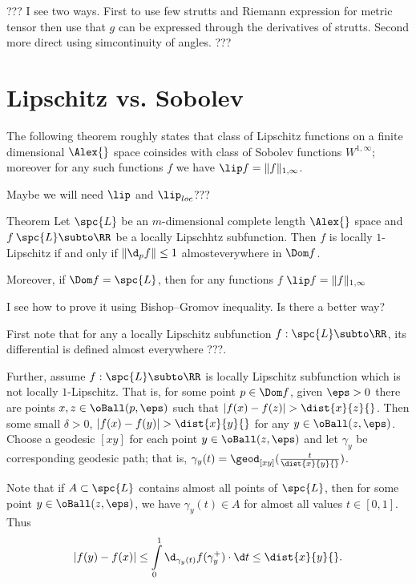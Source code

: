 ??? I see two ways. First to use few strutts and Riemann expression for metric tensor then use that $g$ can be expressed through the derivatives of strutts.
Second more direct using  simcontinuity of angles.
???
\qeds












\section{Lipschitz vs. Sobolev}

The following theorem roughly states that class of Lipschitz functions on a finite dimensional $\Alex{}$ space 
coinsides with class of Sobolev functions $W^{1,\infty}$;
moreover for any such functions $f$ we have $\lip f=\|f\|_{1,\infty}$. 

Maybe we will need $\lip$ and $\lip_{loc}$???

\begin{thm}{Theorem}
Let $\spc{L}$ be an $m$-dimensional complete length $\Alex{}$ space and $f\:\spc{L}\subto\RR$ be a locally Lipschhtz subfunction.
Then $f$ is locally $1$-Lipschitz if and only if $\|\d_pf\|\le1$ almosteverywhere in $\Dom f$.

Moreover, if $\Dom f=\spc{L}$, then for any functions $f$
$\lip f=\|f\|_{1,\infty}$
\end{thm}

 I see how to prove it using Bishop--Gromov inequality.
Is there a better way?

First note that for any a locally Lipschitz subfunction $f:\spc{L}\subto\RR$,
its differential is defined almost everywhere ???.

Further, assume $f:\spc{L}\subto\RR$ is locally Lipschitz subfunction which is not locally $1$-Lipschitz.
That is, for some point $p\in \Dom f$, given $\eps>0$ there are points $x,z\in\oBall(p,\eps)$ such that $|f(x)-f(z)|>\dist{x}{z}{}$.
Then some small $\delta>0$,
$|f(x)-f(y)|>\dist{x}{y}{}$
for any $y\in\oBall(z,\eps)$.
Choose a geodesic $[xy]$ for each point $y\in\oBall(z,\eps)$
and let $\gamma_y$ be corresponding geodesic path;
that is, $\gamma_y(t)=\geod_{[x y]}(\tfrac{t}{\dist{x}{y}{}})$.

Note that if $A\subset \spc{L}$ contains almost all points of $\spc{L}$, then for some point $y\in\oBall(z,\eps)$, we have $\gamma_y(t)\in A$ for almost all values $t\in[0,1]$.
Thus 
\[|f(y)-f(x)|
\le
\int\limits_0^1\d_{\gamma_y(t)}f(\gamma_y^+)\cdot\d t
\le
\dist{x}{y}{}.\]

